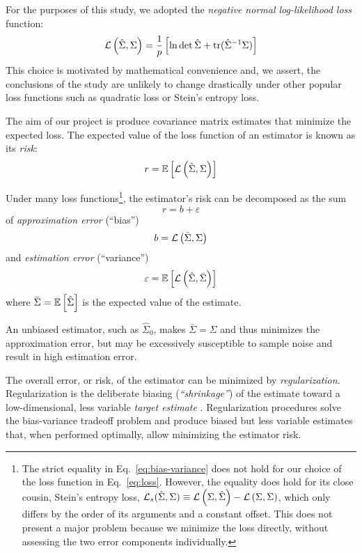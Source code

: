For the purposes of this study, we adopted the \emph{negative normal log-likelihood loss} function:
\begin{equation}\label{eq:loss}
\mathcal L\left(\hat\Sigma,\Sigma\right) = \frac 1 p\left[\ln \det \hat \Sigma + \operatorname{tr}(\hat \Sigma^{-1}\Sigma)\right]
\end{equation}
This choice is motivated by mathematical convenience and, we assert, the conclusions of the study are unlikely to change drastically under other popular loss functions such as quadratic loss or Stein's entropy loss.

The aim of our project is produce covariance matrix estimates that minimize the expected loss.  The expected value of the loss function of an estimator is known as its \emph{risk}: 
\begin{equation}
r = \mathbb E\left[ \mathcal L\left(\hat\Sigma, \Sigma\right)\right]
\end{equation}

Under many loss functions\footnote{
The strict equality in Eq.~\ref{eq:bias-variance} does not hold for our choice of the loss function in Eq.~\ref{eq:loss}. However, the equality does hold for its close cousin, Stein's entropy loss,  $\mathcal L_s(\hat\Sigma,\Sigma) \equiv \mathcal L\left(\Sigma,\hat\Sigma\right) - \mathcal L\left(\Sigma,\Sigma\right)$, which only differs by the order of its arguments and a constant offset. This does not present a major problem because we minimize the loss directly, without assessing the two error components individually.}, 
the estimator's risk can be decomposed as the sum
\begin{equation}\label{eq:bias-variance}
r = b + \varepsilon
\end{equation}
of \emph{approximation error} (``bias'')
\begin{equation}
b = \mathcal L\left(\bar\Sigma,\Sigma\right)
\end{equation}
and \emph{estimation error} (``variance'') 
\begin{equation}
\varepsilon = \mathbb E\left[ \mathcal L\left(\hat\Sigma, \bar\Sigma\right)\right]
\end{equation}
where $\bar\Sigma = \mathbb E\left[ \hat\Sigma\right]$ is the expected value of the estimate. 

An unbiased estimator, such as $\hat\Sigma_0$, makes $\bar\Sigma=\Sigma$ and thus minimizes the approximation error, but may be excessively susceptible to sample noise and result in high estimation error.

The overall error, or risk, of the estimator can be minimized by \emph{regularization}. Regularization is the deliberate biasing (\emph{``shrinkage''}) of the estimate toward a low-dimensional, less variable \emph{target estimate} \cite{Bickel:2006,Ledoit:2004}.  Regularization procedures solve the bias-variance tradeoff problem and produce biased but less variable estimates that, when performed optimally, allow minimizing the estimator risk.

